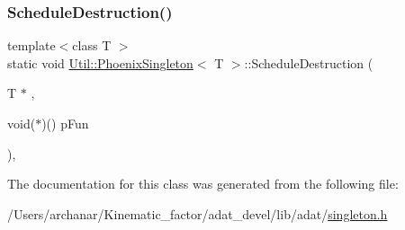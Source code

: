\subsubsection{\texorpdfstring{ScheduleDestruction()}{ScheduleDestruction()}\hspace{0.1cm}{\footnotesize\ttfamily [2/2]}}
{\footnotesize\ttfamily template$<$class T $>$ \\
static void \mbox{\hyperlink{classUtil_1_1PhoenixSingleton}{Util\+::\+Phoenix\+Singleton}}$<$ T $>$\+::Schedule\+Destruction (\begin{DoxyParamCaption}\item[{T $\ast$}]{,  }\item[{void($\ast$)()}]{p\+Fun }\end{DoxyParamCaption})\hspace{0.3cm}{\ttfamily [inline]}, {\ttfamily [static]}}



The documentation for this class was generated from the following file\+:\begin{DoxyCompactItemize}
\item 
/\+Users/archanar/\+Kinematic\+\_\+factor/adat\+\_\+devel/lib/adat/\mbox{\hyperlink{lib_2adat_2singleton_8h}{singleton.\+h}}\end{DoxyCompactItemize}
